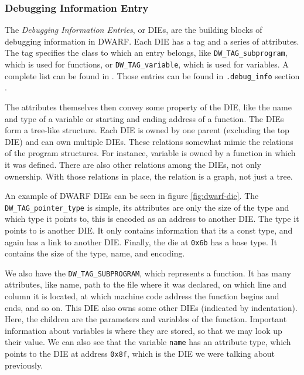 \subsubsection{Debugging Information Entry}
The \textit{Debugging Information Entries}, or DIEs, are the building blocks of
debugging information in DWARF. Each DIE has a tag and a series of attributes.
The tag specifies the class to which an entry belongs, like
\texttt{DW\_TAG\_subprogram}, which is used for functions, or
\texttt{DW\_TAG\_variable}, which is used for variables. A complete list can be
found in \cite{dwarf}. Those entries can be found in \texttt{.debug\_info}
section \cite{dwarf}. 

The attributes themselves then convey some property of the DIE, like the name
and type of a variable or starting and ending address of a function. The DIEs
form a tree-like structure. Each DIE is owned by one parent (excluding the top
DIE) and can own multiple DIEs. These relations somewhat mimic the relations of
the program structures. For instance, variable is owned by a function in which
it was defined. There are also other relations among the DIEs, not only
ownership. With those relations in place, the relation is a graph, not just a
tree.

An example of DWARF DIEs can be seen in figure \ref{fig:dwarf-die}. The
\texttt{DW\_TAG\_pointer\_type} is simple, its attributes are only the size of
the type and which type it points to, this is encoded as an address to another
DIE. The type it points to is another DIE. It only contains information that
its a const type, and again has a link to another DIE. Finally, the die at
\texttt{0x6b} has a base type. It contains the size of the type, name, and
encoding. 

We also have the \texttt{DW\_TAG\_SUBPROGRAM}, which represents a function. It
has many attributes, like name, path to the file where it was declared, on
which line and column it is located, at which machine code address the function
begins and ends, and so on. This DIE also owns some other DIEs (indicated by
indentation). Here, the children are the parameters and variables of the
function. Important information about variables is where they are stored, so
that we may look up their value. We can also see that the variable
\texttt{name} has an attribute type, which points to the DIE at address
\texttt{0x8f}, which is the DIE we were talking about previously.

